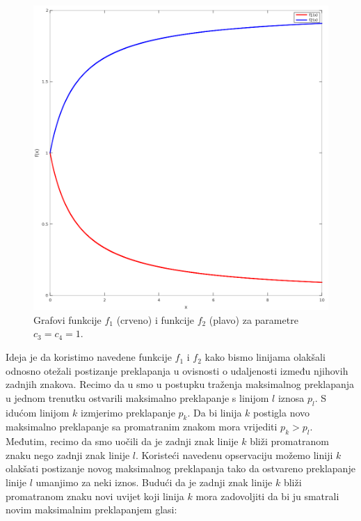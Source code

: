 \documentclass[times, utf8, zavrsni]{fer}
\begin{document}
\begin{figure}[htb]
    \centering
    \captionsetup{justification=centering,margin=2cm}
    \includegraphics[width=\textwidth]{images/function-01.png}
    \caption{
        Grafovi funkcije $f_1$ (crveno) i funkcije $f_2$ (plavo) za parametre
        $c_3 = c_4 = 1$.
    }
    \label{fig:function-01}
\end{figure}

Ideja je da koristimo navedene funkcije $f_1$ i $f_2$ kako bismo linijama
olakšali odnosno otežali postizanje preklapanja u ovisnosti o udaljenosti između
njihovih zadnjih znakova. Recimo da u smo u postupku traženja maksimalnog
preklapanja u jednom trenutku ostvarili maksimalno preklapanje s linijom $l$
iznosa $p_l$. S idućom linijom $k$ izmjerimo preklapanje $p_k$. Da bi linija
$k$ postigla novo maksimalno preklapanje sa promatranim znakom mora vrijediti
$p_k > p_l$. Međutim, recimo da smo uočili da je zadnji znak linije $k$
bliži promatranom znaku nego zadnji znak linije $l$. Koristeći navedenu
opservaciju možemo liniji $k$ olakšati postizanje novog maksimalnog
preklapanja tako da ostvareno preklapanje linije $l$ umanjimo za neki iznos.
Budući da je zadnji znak linije $k$ bliži promatranom znaku novi uvijet koji
linija $k$ mora zadovoljiti da bi ju smatrali novim maksimalnim preklapanjem
glasi:
\end{document}
